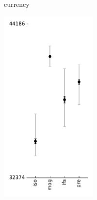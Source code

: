 \documentclass[reprint,amsmath,amssymb,aps,prl]{revtex4-1}
\begin{document}
\begin{figure}[tbh]
\begin{subfigure}{0.49\linewidth}
\begin{subfigure}{\linewidth}
\begin{subfigure}{0.31\linewidth}
			currency
		\end{subfigure} 
		\begin{subfigure}{0.31\linewidth}  
			\includegraphics[width=\linewidth]{../img/gait/likelihoods.pdf}\\

\end{subfigure}
\end{subfigure}
\end{subfigure}
\end{figure}
\end{document}
